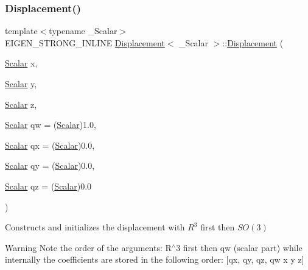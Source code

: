 \subsubsection{\texorpdfstring{Displacement()}{Displacement()}\hspace{0.1cm}{\footnotesize\ttfamily [6/7]}}
{\footnotesize\ttfamily template$<$typename \+\_\+\+Scalar$>$ \\
E\+I\+G\+E\+N\+\_\+\+S\+T\+R\+O\+N\+G\+\_\+\+I\+N\+L\+I\+NE \hyperlink{class_displacement}{Displacement}$<$ \+\_\+\+Scalar $>$\+::\hyperlink{class_displacement}{Displacement} (\begin{DoxyParamCaption}\item[{\hyperlink{class_displacement_ade979a89a65e3b67dea322a0cef92c88}{Scalar}}]{x,  }\item[{\hyperlink{class_displacement_ade979a89a65e3b67dea322a0cef92c88}{Scalar}}]{y,  }\item[{\hyperlink{class_displacement_ade979a89a65e3b67dea322a0cef92c88}{Scalar}}]{z,  }\item[{\hyperlink{class_displacement_ade979a89a65e3b67dea322a0cef92c88}{Scalar}}]{qw = {\ttfamily (\hyperlink{class_displacement_ade979a89a65e3b67dea322a0cef92c88}{Scalar})1.0},  }\item[{\hyperlink{class_displacement_ade979a89a65e3b67dea322a0cef92c88}{Scalar}}]{qx = {\ttfamily (\hyperlink{class_displacement_ade979a89a65e3b67dea322a0cef92c88}{Scalar})0.0},  }\item[{\hyperlink{class_displacement_ade979a89a65e3b67dea322a0cef92c88}{Scalar}}]{qy = {\ttfamily (\hyperlink{class_displacement_ade979a89a65e3b67dea322a0cef92c88}{Scalar})0.0},  }\item[{\hyperlink{class_displacement_ade979a89a65e3b67dea322a0cef92c88}{Scalar}}]{qz = {\ttfamily (\hyperlink{class_displacement_ade979a89a65e3b67dea322a0cef92c88}{Scalar})0.0} }\end{DoxyParamCaption})\hspace{0.3cm}{\ttfamily [inline]}}

Constructs and initializes the displacement with $R^3$ first then $SO(3)$

\begin{DoxyWarning}{Warning}
Note the order of the arguments\+: R$^\wedge$3 first then {\ttfamily qw} (scalar part) while internally the coefficients are stored in the following order\+: \mbox{[}{\ttfamily qx}, {\ttfamily qy}, {\ttfamily qz}, {\ttfamily qw} {\ttfamily x} {\ttfamily y} {\ttfamily z}\mbox{]} 
\end{DoxyWarning}


